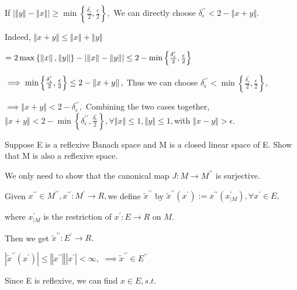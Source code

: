 \documentclass{article}
\begin{document}
If $\left\vert \left\Vert y\right\Vert -\left\Vert x\right\Vert \right\vert
\geq \min \left\{ \frac{\delta _{\epsilon }^{\prime }}{2},\frac{\epsilon }{2}%
\right\} ,$ We can directly choose $\delta _{\epsilon }^{\prime \prime
}<2-\left\Vert x+y\right\Vert .$

Indeed, $\left\Vert x+y\right\Vert \leq \left\Vert x\right\Vert +\left\Vert
y\right\Vert $

$=2\max \left\{ \left\Vert x\right\Vert ,\left\Vert y\right\Vert \right\}
-\left\vert \left\Vert x\right\Vert -\left\Vert y\right\Vert \right\vert
\leq 2-\min \left\{ \frac{\delta _{\epsilon }^{\prime }}{2},\frac{\epsilon }{%
2}\right\} $

$\implies \min \left\{ \frac{\delta _{\epsilon }^{\prime }}{2},\frac{%
\epsilon }{2}\right\} \leq 2-\left\Vert x+y\right\Vert ,$ Thus we can choose 
$\delta _{\epsilon }^{\prime \prime }<\min \left\{ \frac{\delta _{\epsilon
}^{\prime }}{2},\frac{\epsilon }{2}\right\} ,$

$\implies \left\Vert x+y\right\Vert <2-\delta _{\epsilon }^{\prime \prime },$
Combining the two cases together, $\left\Vert x+y\right\Vert <2-\min \left\{
\delta _{\epsilon }^{\prime \prime },\frac{\delta _{\epsilon }^{\prime }}{2}%
\right\} ,\forall \left\Vert x\right\Vert \leq 1,\left\Vert y\right\Vert
\leq 1,$with $\left\Vert x-y\right\Vert >\epsilon .$

Suppose E is a reflexive Banach space and M is a closed linear space of E.
Show that M is also a reflexive space.

We only need to show that the canonical map $J:M\rightarrow M^{\prime \prime
}$ is surjective.

Given $x^{\prime \prime }\in M^{\prime \prime },x^{\prime \prime }:M^{\prime
}\rightarrow R,$we define  $\tilde{x}^{\prime \prime }$ by  $\tilde{x}%
^{\prime \prime }\left( x^{\prime }\right) :=x^{\prime \prime }\left(
x_{|M}^{\prime }\right) ,\forall x^{\prime }\in E,$

where $x_{|M}^{\prime }$ is the restriction of $x^{\prime }:E\rightarrow R$
on $M.$

Then we get $\tilde{x}^{\prime \prime }:E^{\prime }\rightarrow R.$

$\left\vert \tilde{x}^{\prime \prime }\left( x^{\prime }\right) \right\vert
\leq \left\Vert x^{\prime \prime }\right\Vert \left\vert x^{\prime
}\right\vert <\infty ,$ $\implies \tilde{x}^{\prime \prime }\in E^{\prime
\prime }$

Since E is reflexive, we can find $x\in E,s.t.$
\end{document}

